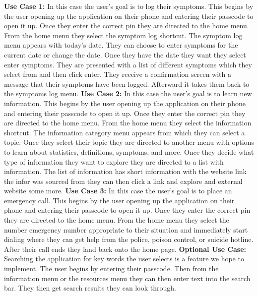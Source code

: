 \documentclass[letterpaper,12pt,titlepage]{article}
\begin{document}
\noindent
\textbf{Use Case 1:} In this case the user’s goal is to log their symptoms. This begins by the user opening up the application on their phone and entering their passcode to open it up. Once they enter the correct pin they are directed to the home menu. From the home menu they select the symptom log shortcut. The symptom log menu appears with today’s date. They can choose to enter symptoms for the current date or change the date. Once they have the date they want they select enter symptoms. They are presented with a list of different symptoms which they select from and then click enter. They receive a confirmation screen with a message that their symptoms have been logged. Afterward it takes them back to the symptoms log menu.
\newline
\newline
\textbf{Use Case 2: }In this case the user’s goal is to learn new information. This begins by the user opening up the application on their phone and entering their passcode to open it up. Once they enter the correct pin they are directed to the home menu. From the home menu they select the information shortcut. The information category menu appears from which they can select a topic. Once they select their topic they are directed to another menu with options to learn about statistics, definitions, symptoms, and more. Once they decide what type of information they want to explore they are directed to a list with information. The list of information has short information with the website link the infor was sourced from they can then click a link and explore and external website some more.
\newline
\newline
\textbf{Use Case 3:} In this case the user’s goal is to place an emergency call. This begins by the user opening up the application on their phone and entering their passcode to open it up. Once they enter the correct pin they are directed to the home menu. From the home menu they select the number emergency number appropriate to their situation and immediately start dialing where they can get help from the police, poison control, or suicide hotline. After their call ends they land back onto the home page.
\newline
\newline
\textbf{Optional Use Case:} Searching the application for key words the user selects is a feature we hope to implement. The user begins by entering their passcode. Then from the information menu or the resources menu they can then enter text into the search bar. They then get search results they can look through.
\end{document}
